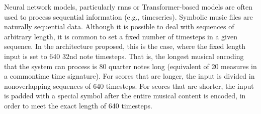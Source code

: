 
Neural network models, particularly \glspl{rnn} or
Transformer-based models are often used to process
sequential information (e.g., timeseries). Symbolic music
files are naturally sequential data. Although it is possible
to deal with sequences of arbitrary length, it is common to
set a fixed number of timesteps in a given sequence. In the
architecture proposed, this is the case, where the fixed
length input is set to 640 \gls{32nd} note timesteps. That
is, the longest musical encoding that the system can process
is 80 \gls{quarter} notes long (equivalent of 20 measures in
a \gls{commontime} time signature). For scores that are
longer, the input is divided in nonoverlapping sequences of
640 timesteps. For scores that are shorter, the input is
padded with a special symbol after the entire musical
content is encoded, in order to meet the exact length of 640
timesteps.
